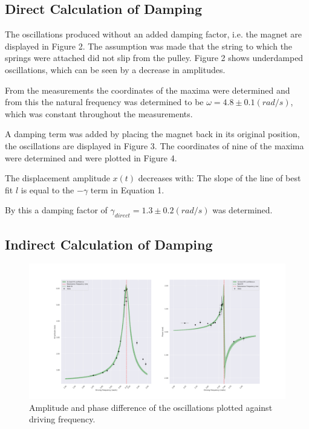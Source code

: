 \subsection{Direct Calculation of Damping} \label{sec:direct_damping}

The oscillations produced without an added damping factor, i.e. the magnet are displayed in Figure 2. The assumption was made that the string to which the springs were attached did not slip from the pulley. Figure 2 shows underdamped oscillations, which can be seen by a decrease in amplitudes.


From the measurements the coordinates of the maxima were determined and from this the natural frequency was determined to be $\omega = 4.8 \pm 0.1 (rad/s)$, which was constant throughout the measurements.

A damping term was added by placing the magnet back in its original position, the oscillations are displayed in Figure 3. The coordinates of nine of the maxima were determined and were plotted in Figure 4. 


The displacement amplitude $x(t)$ decreases with:
The slope of the line of best fit $l$ is equal to the $-\gamma$ term in Equation 1.

By this a damping factor of $\gamma_{direct} = 1.3 \pm 0.2 (rad/s)$ was determined.

\subsection{Indirect Calculation of Damping} \label{sec:indirect_damping}

\begin{figure}[H]
  \centering
  \includegraphics[width=1\textwidth]{oscillations/images/resonance}
  \caption{Amplitude and phase difference of the oscillations plotted against driving frequency.}
  \label{fig:resonance}
\end{figure}

